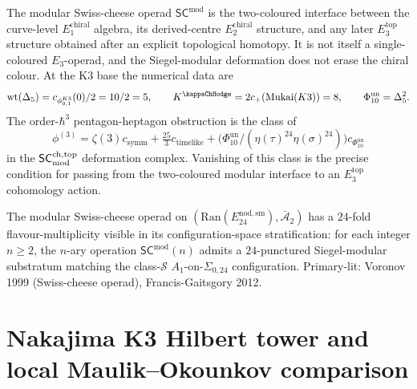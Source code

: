 \begin{remark}
\label{rem:msco-deep-1}
The modular Swiss-cheese operad $\mathsf{SC}^{\mathrm{mod}}$ is the
two-coloured interface between the curve-level
$E_1^{\mathrm{chiral}}$ algebra, its derived-centre
$E_2^{\mathrm{chiral}}$ structure, and any later
$E_3^{\mathrm{top}}$ structure obtained after an explicit
topological homotopy. It is not itself a single-coloured
$E_3$-operad, and the Siegel-modular deformation does not erase the
chiral colour. At the K3 base the numerical data are
\[
 \operatorname{wt}(\Delta_5)
 = c_{\phi_{0,1}^{K3}}(0)/2 = 10/2 = 5,\qquad
 K^{\kappaChHodge}=2c_+(\mathrm{Mukai}(K3))=8,
 \qquad
 \Phi_{10}^{\mathrm{un}}=\Delta_5^2.
\]
The order-$\hbar^3$ pentagon-heptagon obstruction is the class of
\[
 \phi^{(3)}
 = \zeta(3)c_{\mathrm{symm}}
 + \tfrac{25}{3}c_{\mathrm{timelike}}
 + \bigl(\Phi_{10}^{\mathrm{un}}/(\eta(\tau)^{24}\eta(\sigma)^{24})\bigr)c_{\Phi_{10}^{\mathrm{un}}}
\]
in the $\mathsf{SC}^{\mathrm{ch,top}}_{\mathrm{mod}}$ deformation complex. Vanishing of this class is the
precise condition for passing from the two-coloured modular interface
to an $E_3^{\mathrm{top}}$ cohomology action.
\end{remark}

\begin{remark}
\label{rem:msco-deep-2}
The modular Swiss-cheese operad on
$(\mathrm{Ran}(E^{\mathrm{nod,sm}}_{24}),\bar{\mathcal A}_2)$ has a
$24$-fold flavour-multiplicity visible in its configuration-space
stratification: for each integer $n\ge 2$, the $n$-ary operation
$\mathsf{SC}^{\mathrm{mod}}(n)$ admits a $24$-punctured Siegel-modular
substratum matching the class-$\mathcal S$ $A_1$-on-$\Sigma_{0,24}$
configuration. Primary-lit: Voronov 1999 (Swiss-cheese operad),
Francis-Gaitsgory 2012.
\end{remark}

\section{Nakajima K3 Hilbert tower and local Maulik--Okounkov comparison}
\label{sec:msco-MO-yangian-K3-hilb}


